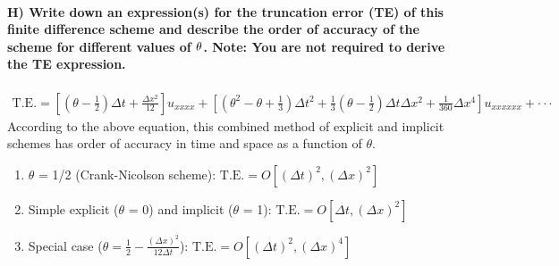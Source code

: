 \documentclass[letterpaper,10pt,english]{sphinxmanual}
\begin{document}
\paragraph{H) Write down an expression(s) for the truncation error (TE) of this finite difference scheme and describe the order of accuracy of the scheme for different values of \protect\(\theta\protect\). Note: You are not required to derive the TE expression.}
\label{\detokenize{cases/results:h-write-down-an-expression-s-for-the-truncation-error-te-of-this-finite-difference-scheme-and-describe-the-order-of-accuracy-of-the-scheme-for-different-values-of-note-you-are-not-required-to-derive-the-te-expression}}\begin{equation*}
\begin{split}\text{T.E.} = \left [ \left ( \theta - \frac{1}{2} \right ) \Delta t + \frac{\Delta x^{2}}{12} \right ]u_{xxxx} + \left [ \left ( \theta^{2} - \theta + \frac{1}{3} \right )\Delta t^2 + \frac{1}{3} \left ( \theta - \frac{1}{2} \right )\Delta t \Delta x^2 + \frac{1}{360} \Delta x^{4} \right ] u_{xxxxxx} + \cdot \cdot \cdot\end{split}
\end{equation*}
According to the above equation, this combined method of explicit and implicit schemes has order of accuracy in time and space as a function of \(\theta\).
\begin{enumerate}
\item {} 
\(\theta\) = 1/2 (Crank-Nicolson scheme): \(\text{T.E.} = O\left [ (\Delta t)^{2}, (\Delta x)^{2} \right ]\)

\item {} 
Simple explicit (\(\theta\) = 0) and implicit (\(\theta\) = 1): \(\text{T.E.} = O\left [ \Delta t, (\Delta x)^{2} \right ]\)

\item {} 
Special case (\(\theta = \frac{1}{2} - \frac{(\Delta x)^{2}}{12\Delta t}\)): \(\text{T.E.} = O \left [ (\Delta t)^{2}, (\Delta x)^{4} \right ]\)

\end{enumerate}
\end{document}
